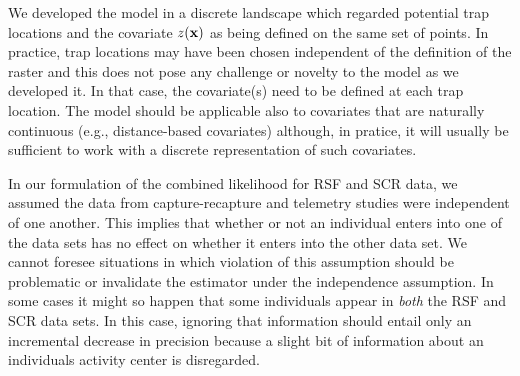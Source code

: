 \documentclass[12pt]{article}
\begin{document}
We developed the model in a discrete landscape which regarded
potential trap
locations and the covariate $z({\bf x})$ as being defined on the same
set of points. In practice, trap locations may have been chosen
independent of the definition of the raster and this does not pose any
challenge or novelty to the model as we developed it. In that 
case, the covariate(s) need to be defined  at each trap location. 
The model should be applicable also to covariates that are naturally
continuous (e.g., distance-based covariates) although, in pratice, it
will usually be sufficient to work with a discrete representation of
such covariates. 


In our formulation of the combined likelihood for RSF and SCR data, we
assumed the data from capture-recapture and telemetry studies were
independent of one another. This implies that whether or not an
individual enters into one of the data sets has no effect on whether
it enters into the other data set. We cannot foresee situations in
which violation of this assumption should be problematic or invalidate
the estimator under the independence assumption.  In some cases it
might so happen that some individuals appear in {\it both} the RSF and
SCR data sets. In this case, ignoring that information should entail
only an incremental decrease in precision because a slight bit of
information about an individuals activity center is disregarded.
\end{document}
